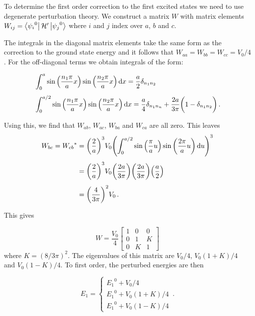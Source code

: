 \documentclass[12pt, titlepage]{article}
\begin{document}
\begin{mdframed}[backgroundcolor=gray!20]
To determine the first order correction to the first excited states we need to use degenerate perturbation theory. We construct a matrix $W$ with matrix elements $W_{ij} = \bra{{\psi_i}^0}\mathcal{H}^\prime\ket{{\psi_j}^0}$ where $i$ and $j$ index over $a$, $b$ and $c$.

The integrals in the diagonal matrix elements take the same form as the correction to the ground state energy and it follows that $W_{aa} = W_{bb} = W_{cc} = V_0/4$. For the off-diagonal terms we obtain integrals of the form:

\begin{align*}
	&\int_{0}^{a}\sin\qty(\frac{n_1\pi}{a}x)\sin\qty(\frac{n_2\pi}{a}x)\dd{x} = \frac{a}{2}\delta_{n_{1}n_{2}} \\[4pt]
	&\int_{0}^{a/2}\sin\qty(\frac{n_1\pi}{a}x)\sin\qty(\frac{n_2\pi}{a}x)\dd{x} = \frac{a}{4}\delta_{n_{1}n_{n}} + \frac{2a}{3\pi}\biggl(1-\delta_{n_{1}n_{2}}\biggr) \,.
\end{align*}

Using this, we find that $W_{ab}$, $W_{ac}$, $W_{ba}$ and $W_{ca}$ are all zero. This leaves
\begin{align*}
	W_{bc} = {W_{cb}}^* &= \qty(\frac{2}{a})^3V_0\qty(\int_{0}^{a/2}\sin\qty(\frac{\pi}{a}u)\sin\qty(\frac{2\pi}{a}u)\dd{u} )^3 \\[4pt]
	&= \qty(\frac{2}{a})^3V_0\qty(\frac{2a}{3\pi})\qty(\frac{2a}{3\pi})\qty(\frac{a}{2}) \\[4pt]
	&= \qty(\frac{4}{3\pi})^2V_0 \,.
\end{align*}

This gives

\begin{equation*}
	W = \frac{V_0}{4}
	\begin{bmatrix}
	1 & 0 & 0 \\
	0 & 1 & K \\
	0 & K & 1 
	\end{bmatrix}
\end{equation*}
where $K = (8/3\pi)^2$. The eigenvalues of this matrix are $V_0/4$, $V_0(1+K)/4$ and $V_0(1-K)/4$. To first order, the perturbed energies are then

\begin{equation*}
	E_1 = \left\{
	\begin{array}{l}
	{E_1}^0 + V_0/4 \\
	{E_1}^0 + V_0(1+K)/4 \\
	{E_1}^0 + V_0(1-K)/4
	\end{array}
	\right. \,.
\end{equation*}


\end{mdframed}
\end{document}
